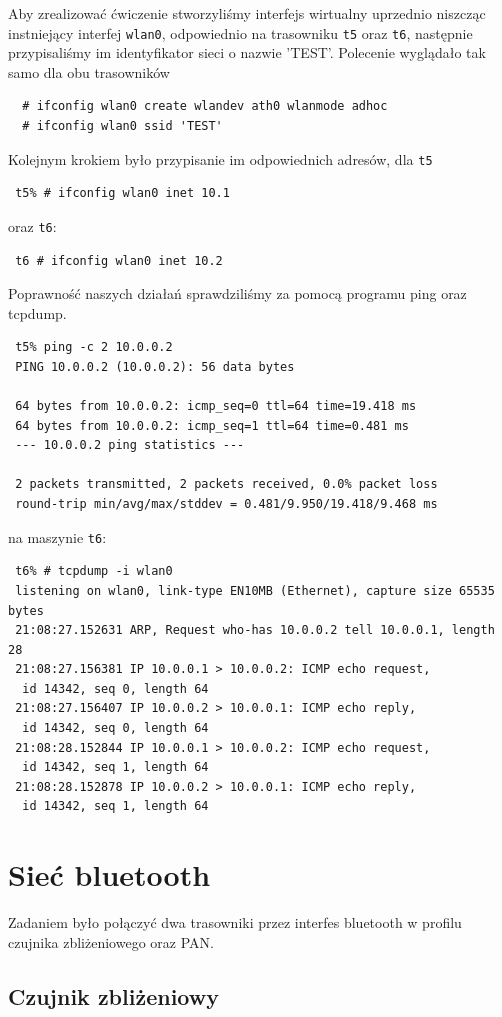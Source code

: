 \documentclass[a4paper,11pt,notitlepage]{article}
\begin{document}
Aby zrealizować ćwiczenie stworzyliśmy interfejs wirtualny uprzednio niszcząc instniejący interfej \verb+wlan0+,
odpowiednio na trasowniku \verb+t5+ oraz \verb+t6+, następnie przypisaliśmy im identyfikator sieci o nazwie 'TEST'. Polecenie wyglądało tak samo dla obu trasowników
\begin{verbatim}
  # ifconfig wlan0 create wlandev ath0 wlanmode adhoc
  # ifconfig wlan0 ssid 'TEST'
\end{verbatim}
Kolejnym krokiem było przypisanie im odpowiednich adresów, dla \verb+t5 +  
\begin{verbatim}
 t5% # ifconfig wlan0 inet 10.1
\end{verbatim}
oraz \verb+t6+:
\begin{verbatim}
 t6 # ifconfig wlan0 inet 10.2
\end{verbatim}
Poprawność naszych działań sprawdziliśmy za pomocą programu ping oraz tcpdump.
\begin{verbatim}
 t5% ping -c 2 10.0.0.2
 PING 10.0.0.2 (10.0.0.2): 56 data bytes

 64 bytes from 10.0.0.2: icmp_seq=0 ttl=64 time=19.418 ms
 64 bytes from 10.0.0.2: icmp_seq=1 ttl=64 time=0.481 ms
 --- 10.0.0.2 ping statistics ---

 2 packets transmitted, 2 packets received, 0.0% packet loss
 round-trip min/avg/max/stddev = 0.481/9.950/19.418/9.468 ms
\end{verbatim}
na maszynie \verb+t6+:
\begin{verbatim}
 t6% # tcpdump -i wlan0
 listening on wlan0, link-type EN10MB (Ethernet), capture size 65535 bytes
 21:08:27.152631 ARP, Request who-has 10.0.0.2 tell 10.0.0.1, length 28
 21:08:27.156381 IP 10.0.0.1 > 10.0.0.2: ICMP echo request,
  id 14342, seq 0, length 64
 21:08:27.156407 IP 10.0.0.2 > 10.0.0.1: ICMP echo reply, 
  id 14342, seq 0, length 64
 21:08:28.152844 IP 10.0.0.1 > 10.0.0.2: ICMP echo request, 
  id 14342, seq 1, length 64
 21:08:28.152878 IP 10.0.0.2 > 10.0.0.1: ICMP echo reply, 
  id 14342, seq 1, length 64
\end{verbatim}



\section{Sieć bluetooth} 

Zadaniem było połączyć dwa trasowniki przez interfes bluetooth w profilu czujnika zbliżeniowego oraz PAN.

\subsection{Czujnik zbliżeniowy}
\end{document}
